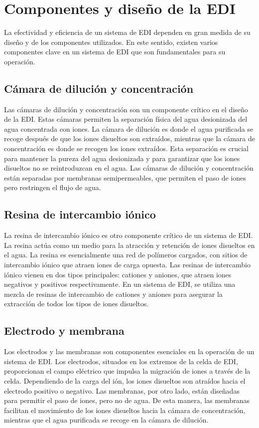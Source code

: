 \section{Componentes y diseño de la EDI}
La efectividad y eficiencia de un sistema de EDI dependen en gran medida de su diseño y de los componentes utilizados. En este sentido, existen varios componentes clave en un sistema de EDI que son fundamentales para su operación. \\

\subsection{Cámara de dilución y concentración}
Las cámaras de dilución y concentración son un componente crítico en el diseño de la EDI. Estas cámaras permiten la separación física del agua desionizada del agua concentrada con iones. La cámara de dilución es donde el agua purificada se recoge después de que los iones disueltos son extraídos, mientras que la cámara de concentración es donde se recogen los iones extraídos. Esta separación es crucial para mantener la pureza del agua desionizada y para garantizar que los iones disueltos no se reintroduzcan en el agua. Las cámaras de dilución y concentración están separadas por membranas semipermeables, que permiten el paso de iones pero restringen el flujo de agua. \\

\subsection{Resina de intercambio iónico}
La resina de intercambio iónico es otro componente crítico de un sistema de EDI. La resina actúa como un medio para la atracción y retención de iones disueltos en el agua. La resina es esencialmente una red de polímeros cargados, con sitios de intercambio iónico que atraen iones de carga opuesta. Las resinas de intercambio iónico vienen en dos tipos principales: cationes y aniones, que atraen iones negativos y positivos respectivamente. En un sistema de EDI, se utiliza una mezcla de resinas de intercambio de cationes y aniones para asegurar la extracción de todos los tipos de iones disueltos. \\

\subsection{Electrodo y membrana}
Los electrodos y las membranas son componentes esenciales en la operación de un sistema de EDI. Los electrodos, situados en los extremos de la celda de EDI, proporcionan el campo eléctrico que impulsa la migración de iones a través de la celda. Dependiendo de la carga del ión, los iones disueltos son atraídos hacia el electrodo positivo o negativo. Las membranas, por otro lado, están diseñadas para permitir el paso de iones, pero no de agua. De esta manera, las membranas facilitan el movimiento de los iones disueltos hacia la cámara de concentración, mientras que el agua purificada se recoge en la cámara de dilución. \\

